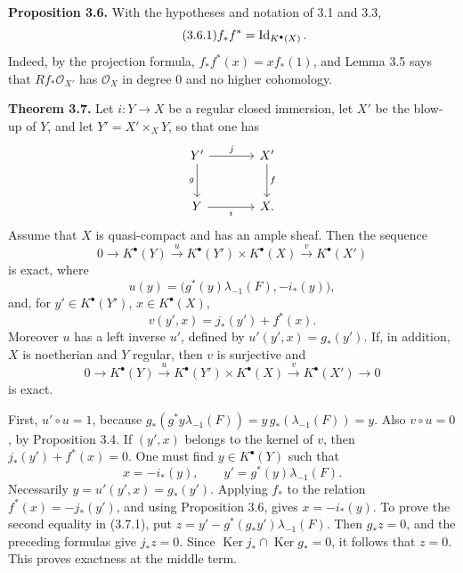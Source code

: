 \documentclass[11pt]{article}
\providecommand{\Ker}{\operatorname{Ker}}
\providecommand{\cO}{\mathcal O}
\begin{document}
\textbf{Proposition 3.6.} With the hypotheses and notation of 3.1 and 3.3,
\begin{equation}\tag{3.6.1}
f_*f^*=\operatorname{Id}_{K^\bullet(X)}.
\end{equation}
Indeed, by the projection formula, \(f_*f^*(x)=x f_*(1)\), and Lemma 3.5 says that \(Rf_*\cO_{X'}\) has \(\cO_X\) in degree \(0\) and no higher cohomology.

\textbf{Theorem 3.7.} Let \(i:Y\to X\) be a regular closed immersion, let \(X'\) be the blow-up of \(Y\), and let \(Y'=X'\times_XY\), so that one has
\[
\begin{tikzcd}[column sep=large,row sep=large]
Y' \arrow[r,"j"] \arrow[d,"g"'] & X' \arrow[d,"f"]\\
Y \arrow[r,"i"'] & X.
\end{tikzcd}
\]
Assume that \(X\) is quasi-compact and has an ample sheaf. Then the sequence
\begin{equation}\tag{3.7.0}
0\to K^\bullet(Y)\xrightarrow{u}K^\bullet(Y')\times K^\bullet(X)\xrightarrow{v}K^\bullet(X')
\end{equation}
is exact, where
\begin{equation}\tag{3.7.u}
u(y)=\bigl(g^*(y)\lambda_{-1}(F),-i_*(y)\bigr),
\end{equation}
and, for \(y'\in K^\bullet(Y')\), \(x\in K^\bullet(X)\),
\begin{equation}\tag{3.7.v}
v(y',x)=j_*(y')+f^*(x).
\end{equation}
Moreover \(u\) has a left inverse \(u'\), defined by \(u'(y',x)=g_*(y')\). If, in addition, \(X\) is noetherian and \(Y\) regular, then \(v\) is surjective and
\begin{equation}\tag{3.7.2}
0\to K^\bullet(Y)\xrightarrow{u}K^\bullet(Y')\times K^\bullet(X)\xrightarrow{v}K^\bullet(X')\to0
\end{equation}
is exact.

First, \(u'\circ u=1\), because \(g_*(g^*y\lambda_{-1}(F))=y\,g_*(\lambda_{-1}(F))=y\). Also \(v\circ u=0\), by Proposition 3.4. If \((y',x)\) belongs to the kernel of \(v\), then \(j_*(y')+f^*(x)=0\). One must find \(y\in K^\bullet(Y)\) such that
\begin{equation}\tag{3.7.1}
x=-i_*(y),\qquad y'=g^*(y)\lambda_{-1}(F).
\end{equation}
Necessarily \(y=u'(y',x)=g_*(y')\). Applying \(f_*\) to the relation \(f^*(x)=-j_*(y')\), and using Proposition 3.6, gives \(x=-i_*(y)\). To prove the second equality in (3.7.1), put \(z=y'-g^*(g_*y')\lambda_{-1}(F)\). Then \(g_*z=0\), and the preceding formulas give \(j_*z=0\). Since \(\Ker j_*\cap\Ker g_*=0\), it follows that \(z=0\). This proves exactness at the middle term.
\end{document}
